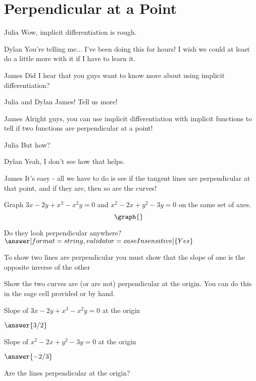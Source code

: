 \documentclass{ximera}
\begin{document}
\section{Perpendicular at a Point}
\begin{dialogue}
\item[Julia] Wow, implicit differentiation is rough.
\item[Dylan] You're telling me... I've been doing this for hours! I wish we could at least do a little more with it if I have to learn it.
\item[James] Did I hear that you guys want to know more about using implicit differentiation?
\item[Julia and Dylan] James! Tell us more!
\item[James] Alright guys, you can use implicit differentiation with implicit functions to tell if two functions are perpendicular at a point!
\item[Julia] But how?
\item[Dylan] Yeah, I don't see how that helps.
\item[James] It's easy - all we have to do is see if the tangent lines are perpendicular at that point, and if they are, then so are the curves!
\end{dialogue}
\begin{question}
Graph $3x - 2y + x^3-x^2y = 0$ and $x^2 - 2x + y^2 - 3y = 0$ on the same set of axes.
\[
\graph{}
\]

Do they look perpendicular anywhere?
$\answer[format=string,validator=caseInsensitive]{Yes}$
\end{question}
\begin{question}
\begin{hint}
To show two lines are perpendicular you must show that the slope of one is the opposite inverse of the other
\end{hint}
Show the two curves are (or are not) perpendicular at the origin. You can do this in the sage cell provided or by hand.
\begin{onlineOnly}
\begin{sageCell}

\end{sageCell}
\end{onlineOnly}
Slope of $3x - 2y + x^3-x^2y = 0$ at the origin 

$\answer{3/2}$

Slope of $x^2 - 2x + y^2 - 3y = 0$ at the origin 

$\answer{-2/3}$

Are the lines perpendicular at the origin?



\end{question}
\end{document}
